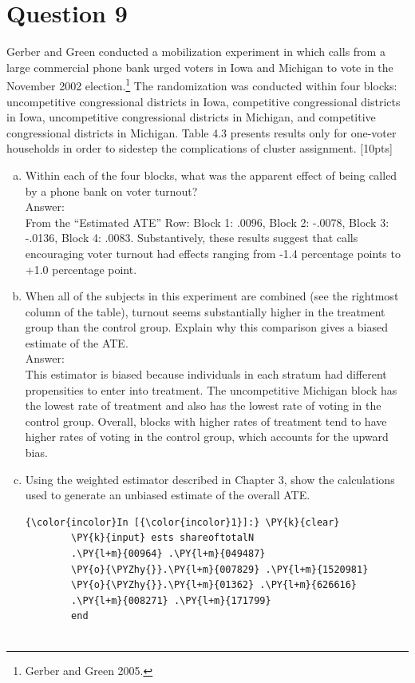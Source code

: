 \documentclass[11pt,notitlepage]{article}\usepackage[]{graphicx}\usepackage[]{color}
\makeatletter
\newenvironment{kframe}{%
 \def\at@end@of@kframe{}%
 \ifinner\ifhmode%
  \def\at@end@of@kframe{\end{minipage}}%
  \begin{minipage}{\columnwidth}%
 \fi\fi%
 \def\FrameCommand##1{\hskip\@totalleftmargin \hskip-\fboxsep
 \colorbox{shadecolor}{##1}\hskip-\fboxsep
     \hskip-\linewidth \hskip-\@totalleftmargin \hskip\columnwidth}%
 \MakeFramed {\advance\hsize-\width
   \@totalleftmargin\z@ \linewidth\hsize
   \@setminipage}}%
 {\par\unskip\endMakeFramed%
 \at@end@of@kframe}
\newenvironment{knitrout}{}{} %
\makeatother
\begin{document}
\section*{Question 9}
Gerber and Green conducted a mobilization experiment in which calls from a large commercial phone bank urged voters in Iowa and Michigan to vote in the November 2002 election.\footnote{Gerber and Green 2005.} The randomization was conducted within four blocks: uncompetitive congressional districts in Iowa, competitive congressional districts in Iowa, uncompetitive congressional districts in Michigan, and competitive congressional districts in Michigan. Table 4.3 presents results only for one-voter households in order to sidestep the complications of cluster assignment. [10pts]



\begin{enumerate}[a)]
\item Within each of the four blocks, what was the apparent effect of being called by a phone bank on voter turnout?  \\
Answer:\\
From the ``Estimated ATE'' Row: Block 1: .0096, Block 2: -.0078, Block 3: -.0136, Block 4: .0083.  Substantively, these results suggest that calls encouraging voter turnout had effects ranging from -1.4 percentage points to +1.0 percentage point.
\item When all of the subjects in this experiment are combined (see the rightmost column of the table), turnout seems substantially higher in the treatment group than the control group.  Explain why this comparison gives a biased estimate of the ATE.\\
Answer:\\
This estimator is biased because individuals in each stratum had different propensities to enter into treatment. The uncompetitive Michigan block has the lowest rate of treatment and also has the lowest rate of voting in the control group. Overall, blocks with higher rates of treatment tend to have higher rates of voting in the control group, which accounts for the upward bias.
\item Using the weighted estimator described in Chapter 3, show the calculations used to generate an unbiased estimate of the overall ATE. 
\begin{knitrout}
\color{fgcolor}\begin{kframe}

    \begin{Verbatim}[commandchars=\\\{\}]
{\color{incolor}In [{\color{incolor}1}]:} \PY{k}{clear}
        \PY{k}{input} ests shareoftotalN
        .\PY{l+m}{00964} .\PY{l+m}{049487}
        \PY{o}{\PYZhy{}}.\PY{l+m}{007829} .\PY{l+m}{1520981}
        \PY{o}{\PYZhy{}}.\PY{l+m}{01362} .\PY{l+m}{626616}
        .\PY{l+m}{008271} .\PY{l+m}{171799}
        end
        

\end{Verbatim}
\end{kframe}
\end{knitrout}
\end{enumerate}
\end{document}
